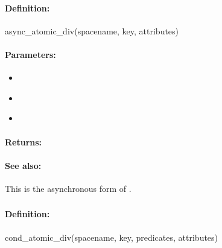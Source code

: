 \paragraph{Definition:}
\begin{rubycode}
async_atomic_div(spacename, key, attributes)
\end{rubycode}

\paragraph{Parameters:}
\begin{itemize}[noitemsep]
\item {}\\

\item {}\\

\item {}\\

\end{itemize}

\paragraph{Returns:}


\paragraph{See also:}  This is the asynchronous form of .

\pagebreak
\subsubsection{}
\label{api:ruby:cond_atomic_div}


\paragraph{Definition:}
\begin{rubycode}
cond_atomic_div(spacename, key, predicates, attributes)
\end{rubycode}

